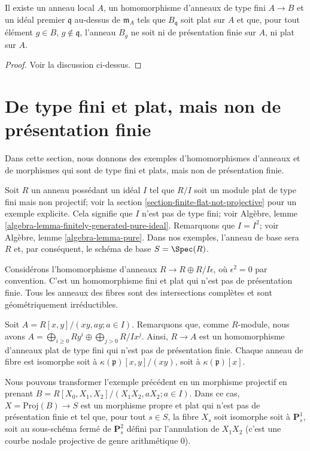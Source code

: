 \begin{lemma}
\label{lemma-example-raynaud-gruson}
Il existe un anneau local $A$, un homomorphisme d'anneaux de type fini $A \to B$ et un idéal premier
$\mathfrak q$ au-dessus de $\mathfrak m_A$ tels que $B_{\mathfrak q}$ soit plat
sur $A$ et que, pour tout élément $g \in B$, $g \not \in \mathfrak q$,
l'anneau $B_g$ ne soit ni de présentation finie sur $A$, ni plat sur $A$.
\end{lemma}

\begin{proof}
Voir la discussion ci-dessus.
\end{proof}


\section{De type fini et plat, mais non de présentation finie}
\label{section-finite-type-flat-not-finite-presentation}

\noindent
Dans cette section, nous donnons des exemples d'homomorphismes d'anneaux et de morphismes
qui sont de type fini et plats, mais non de présentation finie.

\medskip\noindent
Soit $R$ un anneau possédant un idéal $I$ tel que $R/I$ soit un module
plat de type fini mais non projectif; voir la
section \ref{section-finite-flat-not-projective}
pour un exemple explicite. Cela signifie que $I$ n'est pas
de type fini; voir
Algèbre, lemme \ref{algebra-lemma-finitely-generated-pure-ideal}.
Remarquons que $I = I^2$; voir
Algèbre, lemme \ref{algebra-lemma-pure}.
Dans nos exemples, l'anneau de base sera
$R$ et, par conséquent, le schéma de base $S = \Spec(R)$.

\medskip\noindent
Considérons l'homomorphisme d'anneaux $R \to R \oplus R/I\epsilon$, où
$\epsilon^2 = 0$ par convention. C'est un homomorphisme fini et plat
qui n'est pas de présentation finie. Tous les anneaux des fibres
sont des intersections complètes et sont géométriquement irréductibles.

\medskip\noindent
Soit $A = R[x, y]/(xy, ay; a \in I)$. Remarquons que, comme $R$-module,
nous avons $A = \bigoplus_{i \geq 0} Ry^i \oplus \bigoplus_{j > 0} R/Ix^j$.
Ainsi, $R \to A$ est un homomorphisme d'anneaux plat de type fini qui n'est pas de
présentation finie. Chaque anneau de fibre
est isomorphe soit à $\kappa(\mathfrak p)[x, y]/(xy)$,
soit à $\kappa(\mathfrak p)[x]$.

\medskip\noindent
Nous pouvons transformer l'exemple précédent en un morphisme projectif en
prenant $B = R[X_0, X_1, X_2]/(X_1X_2, aX_2; a \in I)$.
Dans ce cas, $X = \text{Proj}(B) \to S$ est un morphisme propre et plat
qui n'est pas de présentation finie et tel que, pour tout $s \in S$,
la fibre $X_s$ soit isomorphe soit à $\mathbf{P}^1_s$, soit au
sous-schéma fermé de $\mathbf{P}^2_s$ défini par l'annulation de
$X_1X_2$ (c'est une courbe nodale projective de genre arithmétique $0$).


